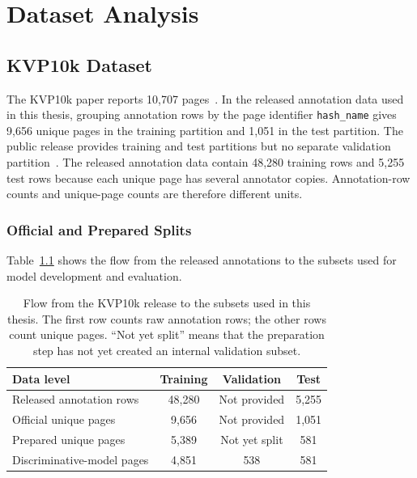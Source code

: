 \chapter{Dataset Analysis}
\label{ch:dataset}

\section{KVP10k Dataset}
\label{sec:kvp10k}

The KVP10k paper reports 10{,}707 pages~\cite{kvp10k}. In the released
annotation data used in this thesis, grouping annotation rows by the page
identifier \texttt{hash\_name} gives 9{,}656 unique pages in the training
partition and 1{,}051 in the test partition. The public release provides
training and test partitions but no separate validation
partition~\cite{kvp10k_repository}.
The released annotation data contain 48{,}280 training rows and 5{,}255 test
rows because each unique page has several annotator copies. Annotation-row
counts and unique-page counts are therefore different units.

\subsection{Official and Prepared Splits}

Table~\ref{tab:dataset_flow} shows the flow from the released annotations to
the subsets used for model development and evaluation.

\begin{table}[ht]
\centering
\small
\caption{Flow from the KVP10k release to the subsets used in this thesis.
The first row counts raw annotation rows; the other rows count unique pages.
``Not yet split'' means that the preparation step has not yet created an
internal validation subset.}
\label{tab:dataset_flow}
\begin{tabular}{@{}lccc@{}}
\toprule
\textbf{Data level} & \textbf{Training} & \textbf{Validation} & \textbf{Test} \\
\midrule
Released annotation rows   & 48{,}280 & Not provided  & 5{,}255 \\
Official unique pages      & 9{,}656  & Not provided  & 1{,}051 \\
Prepared unique pages      & 5{,}389  & Not yet split & 581 \\
Discriminative-model pages & 4{,}851  & 538           & 581 \\
\bottomrule
\end{tabular}
\end{table}

